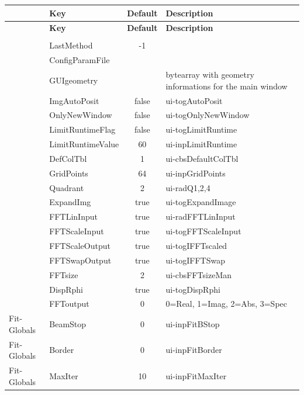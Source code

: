 \documentclass[11pt]{article} %
\begin{document}
\begin{longtable}{|l|l|c|l|}
\hline\rowcolor{rowcolor}{\bf Goup} & {\bf Key} & {\bf Default} & {\bf Description} \\
\endfirsthead
\hline\rowcolor{rowcolor}{\bf Goup} & {\bf Key} & {\bf Default} & {\bf Description} \\
\endhead
\hline
\rowcolor{rowkeycol}\multicolumn{4}{|c|}{Masterkey: {\it GUISettings} }  \\ \hline
 & LastMethod & -1 & \\ \hline
 & ConfigParamFile & & \\ \hline
 & GUIgeometry & & bytearray with geometry informations for the main window \\ \hline
 & ImgAutoPosit & false & ui-togAutoPosit \\ \hline
 & OnlyNewWindow & false & ui-togOnlyNewWindow \\ \hline
 & LimitRuntimeFlag & false & ui-togLimitRuntime \\ \hline
 & LimitRuntimeValue & 60 & ui-inpLimitRuntime \\ \hline
 & DefColTbl & 1 & ui-cbsDefaultColTbl \\ \hline
 & GridPoints & 64 & ui-inpGridPoints \\ \hline
 & Quadrant & 2 & ui-radQ1,2,4 \\ \hline
 & ExpandImg & true & ui-togExpandImage \\ \hline
 & FFTLinInput & true & ui-radFFTLinInput  \\ \hline
 & FFTScaleInput & true & ui-togFFTScaleInput \\ \hline
 & FFTScaleOutput & true & ui-togIFFTscaled \\ \hline
 & FFTSwapOutput & true & ui-togIFFTSwap \\ \hline
 & FFTsize & 2 & ui-cbsFFTsizeMan \\ \hline
 & DispRphi & true & ui-togDispRphi \\ \hline
 & FFToutput & 0 & 0=Real, 1=Imag, 2=Abs, 3=Spec \\ \hline
Fit-Globals & BeamStop & 0 & ui-inpFitBStop \\ \hline
Fit-Globals & Border & 0 & ui-inpFitBorder \\ \hline
Fit-Globals & MaxIter & 10 & ui-inpFitMaxIter \\ \hline

\end{longtable}
\end{document}
